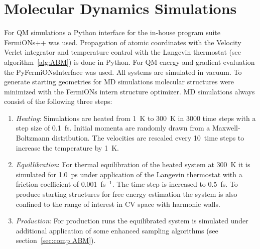 \section{Molecular Dynamics Simulations}
\label{sec:comp MD}
For QM simulations a Python interface for the in-house program suite FermiONs++\autocite{} was used.
Propagation of atomic coordinates with the Velocity Verlet\autocite{swope1982computer} integrator and temperature control with the Langevin thermostat\autocite{kroger2005models} (see algorithm~\ref{alg:ABM}) is done in Python.
For QM energy and gradient evaluation the PyFermiONsInterface was used.
All systems are simulated in vacuum.
To generate starting geometries for MD simulations molecular structures were minimized with the FermiONs intern structure optimizer. MD simulations always consist of the following three steps:
\begin{enumerate}
  \item \textit{Heating}: Simulations are heated from 1~K to 300~K in 3000 time steps with a step size of 0.1~fs. Initial momenta are randomly drawn from a Maxwell-Boltzmann distribution. The velocities are rescaled every 10~time steps to increase the temperature by 1~K.
  \item \textit{Equillibration}: For thermal equilibration of the heated system at 300~K it is simulated for 1.0~ps under application of the Langevin thermostat with a friction coefficient of 0.001~fs$^{-1}$. The time-step is increased to 0.5~fs. To produce starting structures for free energy estimation the system is also confined to the range of interest in CV space with harmonic walls.
  \item \textit{Production}: For production runs the equilibrated system is simulated under additional application of some enhanced sampling algorithms (see section~\ref{sec:comp ABM}).
\end{enumerate}

